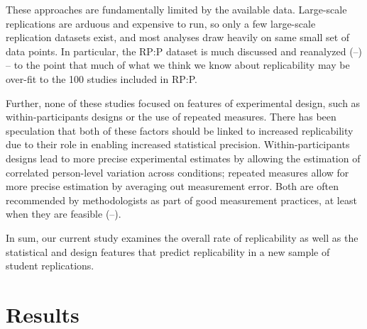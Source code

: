 \documentclass[
  english,
  a4paper,
]{article}
\begin{document}
These approaches are fundamentally limited by the available data. Large-scale replications are arduous and expensive to run, so only a few large-scale replication datasets exist, and most analyses draw heavily on same small set of data points. In particular, the RP:P dataset is much discussed and reanalyzed (--) -- to the point that much of what we think we know about replicability may be over-fit to the 100 studies included in RP:P.

Further, none of these studies focused on features of experimental design, such as within-participants designs or the use of repeated measures. There has been speculation that both of these factors should be linked to increased replicability due to their role in enabling increased statistical precision. Within-participants designs lead to more precise experimental estimates by allowing the estimation of correlated person-level variation across conditions; repeated measures allow for more precise estimation by averaging out measurement error. Both are often recommended by methodologists as part of good measurement practices, at least when they are feasible (--).

In sum, our current study examines the overall rate of replicability as well as the statistical and design features that predict replicability in a new sample of student replications.

\section{Results}\label{results}

    
\end{document}
